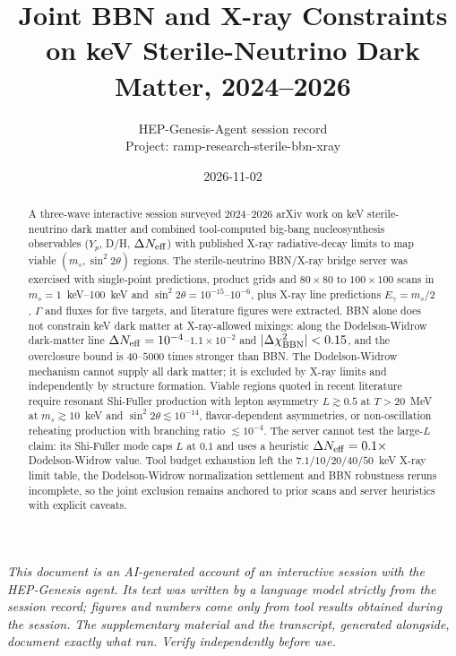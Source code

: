 \documentclass[11pt,a4paper]{article}
\title{Joint BBN and X-ray Constraints on keV Sterile-Neutrino Dark Matter, 2024--2026}
\author{HEP-Genesis-Agent session record \\ \small Project: ramp-research-sterile-bbn-xray}
\date{2026-11-02}
\begin{document}
\maketitle
\noindent\textit{\small This document is an AI-generated account of an interactive session with the HEP-Genesis agent. Its text was written by a language model strictly from the session record; figures and numbers come only from tool results obtained during the session. The supplementary material and the transcript, generated alongside, document exactly what ran. Verify independently before use.}
\vspace{1em}

\begin{abstract}
A three-wave interactive session surveyed 2024--2026 arXiv work on keV sterile-neutrino dark matter and combined tool-computed big-bang nucleosynthesis observables ($Y_{p}$, D/H, $\Delta N_{\rm eff}$) with published X-ray radiative-decay limits to map viable $(m_{s},\sin^{2}2\theta)$ regions. The sterile-neutrino BBN/X-ray bridge server was exercised with single-point predictions, product grids and $80\times80$ to $100\times100$ scans in $m_{s}=1$~keV--100~keV and $\sin^{2}2\theta=10^{-15}$--$10^{-6}$, plus X-ray line predictions $E_{\gamma}=m_{s}/2$, $\Gamma$ and fluxes for five targets, and literature figures were extracted. BBN alone does not constrain keV dark matter at X-ray-allowed mixings: along the Dodelson-Widrow dark-matter line $\Delta N_{\rm eff}=10^{-4}$--$1.1\times10^{-2}$ and $|\Delta\chi^{2}_{\rm BBN}|<0.15$, and the overclosure bound is $40$--$5000$ times stronger than BBN. The Dodelson-Widrow mechanism cannot supply all dark matter; it is excluded by X-ray limits and independently by structure formation. Viable regions quoted in recent literature require resonant Shi-Fuller production with lepton asymmetry $L\gtrsim0.5$ at $T>20$~MeV at $m_{s}\gtrsim10$~keV and $\sin^{2}2\theta\lesssim10^{-14}$, flavor-dependent asymmetries, or non-oscillation reheating production with branching ratio $\lesssim10^{-4}$. The server cannot test the large-$L$ claim: its Shi-Fuller mode caps $L$ at $0.1$ and uses a heuristic $\Delta N_{\rm eff}=0.1\times$ Dodelson-Widrow value. Tool budget exhaustion left the $7.1/10/20/40/50$~keV X-ray limit table, the Dodelson-Widrow normalization settlement and BBN robustness reruns incomplete, so the joint exclusion remains anchored to prior scans and server heuristics with explicit caveats.
\end{abstract}
\end{document}
